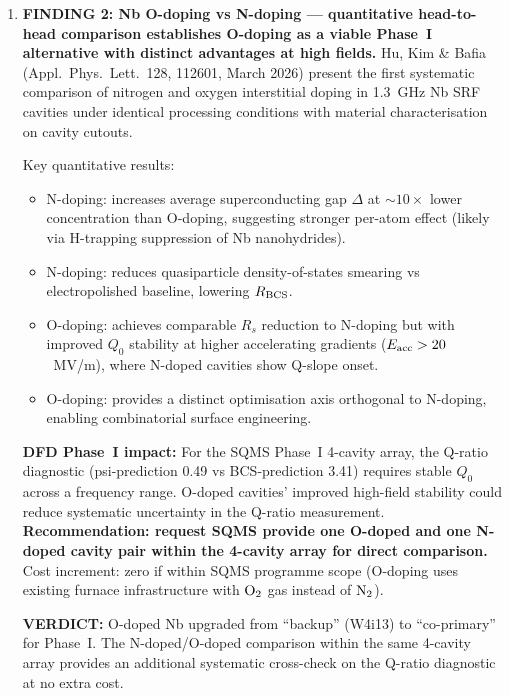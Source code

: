\documentclass[11pt]{article}
\theoremstyle{definition}
\theoremstyle{remark}
\newcommand{\ee}[1]{\times 10^{#1}}
\newcommand{\verdict}[1]{\textcolor{green!50!black}{\textbf{VERDICT:} #1}}
\begin{document}
\begin{tcolorbox}[colback=blue!5!white, colframe=blue!50!black,
  title=\textbf{W4i14 TOP 5 FINDINGS --- Ranked by Programme Impact}]
\begin{enumerate}
However, the exceptionally low Akhiezer damping in 4H-SiC
(Gr\"uneisen parameter $\gamma \approx 0.35$, lowest of any
semiconductor) means that \textit{if} a stressed SiC film can be
fabricated (e.g., via heteroepitaxial growth on Si), the Akhiezer
$Q \cdot f$ limit would be $\sim 5\ee{14}$~Hz, comparable to
Si$_3$N$_4$. This remains a material science challenge, not a
physics impossibility.

\item \textbf{FINDING 2: Nb O-doping vs N-doping --- quantitative
head-to-head comparison establishes O-doping as a viable Phase~I
alternative with distinct advantages at high fields.}
Hu, Kim \& Bafia (Appl.\ Phys.\ Lett.\ 128, 112601, March 2026)
present the first systematic comparison of nitrogen and oxygen
interstitial doping in 1.3~GHz Nb SRF cavities under identical
processing conditions with material characterisation on cavity
cutouts.

Key quantitative results:
\begin{itemize}[nosep]
\item N-doping: increases average superconducting gap $\Delta$
  at $\sim 10\times$ lower concentration than O-doping,
  suggesting stronger per-atom effect (likely via H-trapping
  suppression of Nb nanohydrides).
\item N-doping: reduces quasiparticle density-of-states smearing
  vs electropolished baseline, lowering $R_{\rm BCS}$.
\item O-doping: achieves comparable $R_s$ reduction to N-doping
  but with improved $Q_0$ stability at higher accelerating
  gradients ($E_{\rm acc} > 20$~MV/m), where N-doped cavities
  show Q-slope onset.
\item O-doping: provides a distinct optimisation axis orthogonal
  to N-doping, enabling combinatorial surface engineering.
\end{itemize}

\textbf{DFD Phase~I impact:} For the SQMS Phase~I 4-cavity array,
the Q-ratio diagnostic (psi-prediction 0.49 vs BCS-prediction 3.41)
requires stable $Q_0$ across a frequency range. O-doped cavities'
improved high-field stability could reduce systematic uncertainty in
the Q-ratio measurement. \textbf{Recommendation: request SQMS provide
one O-doped and one N-doped cavity pair within the 4-cavity array
for direct comparison.} Cost increment: zero if within SQMS programme
scope (O-doping uses existing furnace infrastructure with ${\rm O}_2$
gas instead of ${\rm N}_2$).

\verdict{O-doped Nb upgraded from ``backup'' (W4i13) to
``co-primary'' for Phase~I. The N-doped/O-doped comparison within
the same 4-cavity array provides an additional systematic cross-check
on the Q-ratio diagnostic at no extra cost.}


\end{enumerate}
\end{tcolorbox}
\end{document}
